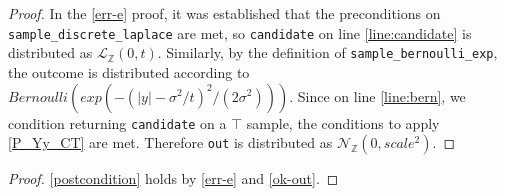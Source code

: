\documentclass{article}
\begin{document}
\begin{proof}
    In the \ref{err-e} proof, it was established that the preconditions on \texttt{sample\_discrete\_laplace} are met, 
    so \texttt{candidate} on line \ref{line:candidate} is distributed as $\mathcal{L}_\mathbb{Z}(0, t)$.
    Similarly, by the definition of \texttt{sample\_bernoulli\_exp}, the outcome is distributed according to $Bernoulli(exp(-(|y| - \sigma^2 / t)^2 / (2 \sigma^2)))$.
    Since on line \ref{line:bern}, we condition returning \texttt{candidate} on a $\top$ sample, 
    the conditions to apply \ref{P_Yy_CT} are met. 
    Therefore \texttt{out} is distributed as $\mathcal{N}_\mathbb{Z}(0, scale^2)$.
\end{proof}

\begin{proof}
    \ref{postcondition} holds by \ref{err-e} and \ref{ok-out}.
\end{proof}



\end{document}
